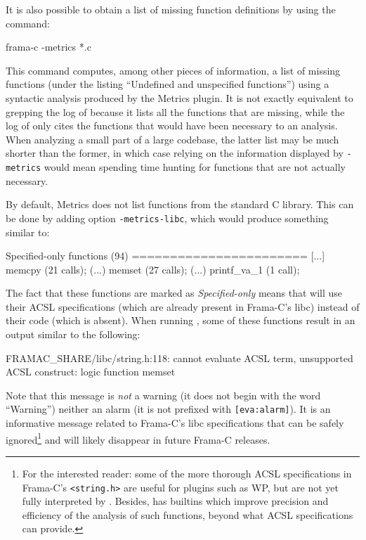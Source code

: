 \documentclass{frama-c-book}
\begin{document}
It is also possible to obtain a list of
missing function definitions by using the command:
\begin{frama-c-commands}
frama-c -metrics *.c
\end{frama-c-commands}
This command computes, among other pieces of information,
a list of missing functions
(under the listing ``Undefined and unspecified functions'')
using a syntactic analysis produced by the \textsf{Metrics} plugin.
It is not exactly equivalent to
grepping the log of \Eva{} because it lists
all the functions that are missing, while the log of
\Eva{} only cites the functions that would have
been necessary to an analysis. When
analyzing a small part of a large codebase, the latter list
may be much shorter than the former, in which case
relying on the information displayed by \lstinline|-metrics| would
mean spending time hunting for functions that are not actually
necessary.

By default, \textsf{Metrics} does not list functions from the standard C
library. This can be done by adding option \verb|-metrics-libc|, which would
produce something similar to:

\begin{logsmath}
Specified-only functions (94)
=======================
[...]
memcpy (21 calls); (...) memset (27 calls); (...) printf_va_1 (1 call);
\end{logsmath}

The fact that these functions are marked as {\em Specified-only}
means that \Eva{} will use their ACSL specifications (which are already present
in Frama-C's libc) instead of their code (which is absent). When running \Eva{},
some of these functions result in an output similar to the following:

\begin{logsmath}
[eva] FRAMAC_SHARE/libc/string.h:118:
  cannot evaluate ACSL term, unsupported ACSL construct: logic function memset
\end{logsmath}

Note that this message is {\em not} a warning (it does not begin with the word
``Warning'') neither an alarm (it is not prefixed with \verb|[eva:alarm]|). It
is an informative message related to Frama-C's libc specifications that can be
safely ignored\footnote{For the interested reader:
some of the more thorough ACSL specifications in Frama-C's
\texttt{<string.h>} are useful for plugins such as \textsf{WP},
but are not yet fully interpreted by \Eva{}. Besides, \Eva{} has builtins which
improve precision and efficiency of the analysis of such functions, beyond what
ACSL specifications can provide.} and will likely disappear in future Frama-C
releases.
\end{document}
